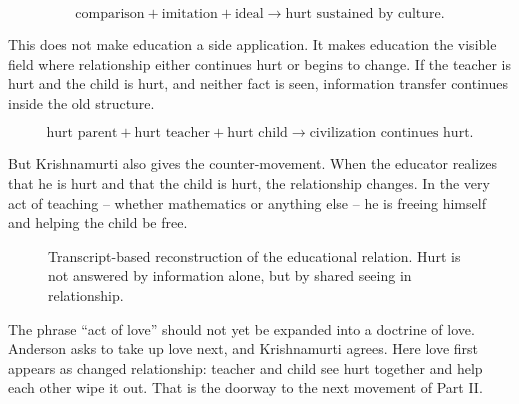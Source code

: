 \documentclass[11pt,oneside]{book}
\begin{document}
\begin{equation}
\text{comparison}+\text{imitation}+\text{ideal}
\longrightarrow
\text{hurt sustained by culture}.
\end{equation}

This does not make education a side application. It makes education the visible field where relationship either continues hurt or begins to change. If the teacher is hurt and the child is hurt, and neither fact is seen, information transfer continues inside the old structure.

\begin{equation}
\text{hurt parent}+\text{hurt teacher}+\text{hurt child}
\longrightarrow
\text{civilization continues hurt}.
\end{equation}

But Krishnamurti also gives the counter-movement. When the educator realizes that he is hurt and that the child is hurt, the relationship changes. In the very act of teaching -- whether mathematics or anything else -- he is freeing himself and helping the child be free.

\begin{figure}
\centering
{}

Transcript-based reconstruction of the educational relation. Hurt is not answered by information alone, but by shared seeing in relationship.
\end{figure}

The phrase ``act of love'' should not yet be expanded into a doctrine of love. Anderson asks to take up love next, and Krishnamurti agrees. Here love first appears as changed relationship: teacher and child see hurt together and help each other wipe it out. That is the doorway to the next movement of Part II.
\end{document}
